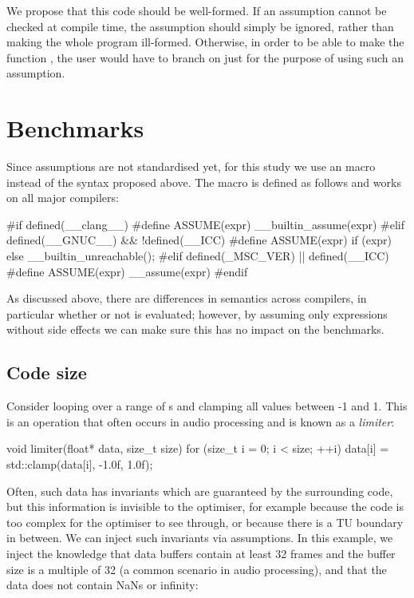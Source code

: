 We propose that this code should be well-formed. If an assumption cannot be checked at compile time, the assumption should simply be ignored, rather than making the whole program ill-formed. Otherwise, in order to be able to make the function , the user would have to branch on  just for the purpose of using such an assumption.


\section{Benchmarks}

Since assumptions are not standardised yet, for this study we use an  macro instead of the syntax proposed above. The macro is defined as follows and works on all major compilers:

\begin{codeblock}
#if defined(__clang__)
  #define ASSUME(expr) __builtin_assume(expr)
#elif defined(__GNUC__) && !defined(__ICC)
  #define ASSUME(expr) if (expr) {} else { __builtin_unreachable(); }
#elif defined(_MSC_VER) || defined(__ICC)
  #define ASSUME(expr) __assume(expr)
#endif
\end{codeblock}

As discussed above, there are differences in semantics across compilers, in particular whether or not  is evaluated; however, by assuming only expressions without side effects we can make sure this has no impact on the benchmarks.

\subsection{Code size}

Consider looping over a range of s and clamping all values between -1 and 1. This is an operation that often occurs in audio processing and is known as a \emph{limiter}:

\begin{codeblock}
void limiter(float* data, size_t size) 
{   
    for (size_t i = 0; i < size; ++i)
        data[i] = std::clamp(data[i], -1.0f, 1.0f);
}
\end{codeblock}

Often, such data has invariants which are guaranteed by the surrounding code, but this information is invisible to the optimiser, for example because the code is too complex for the optimiser to see through, or because there is a TU boundary in between. We can inject such invariants via assumptions. In this example, we inject the knowledge that data buffers contain at least 32 frames and the buffer size is a multiple of 32 (a common scenario in audio processing), and that the data does not contain NaNs or infinity:

